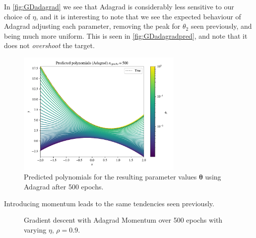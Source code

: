 \documentclass{article}
\theoremstyle{definition}
\begin{document}
In \autoref{fig:GDadagrad} we see that Adagrad is considerably less sensitive to our choice of $\eta$, and it is interesting to note that we see the expected behaviour of Adagrad adjusting each parameter, removing the peak for $\theta_2$ seen previously, and being much more uniform. This is seen in \autoref{fig:GDadagradpred}, and note that it does not \textit{overshoot} the target.

\begin{figure}[H]%
    \centering
    \includegraphics[width=8cm]{Project2/figures/polynomial_grad/OLS_autodiff/adagrad_prediction.pdf}
    \caption{Predicted polynomials for the resulting parameter values $\boldsymbol{\theta}$ using Adagrad after 500 epochs.}
    \label{fig:GDadagradpred}
\end{figure}

Introducing momentum leads to the same tendencies seen previously.

\begin{figure}[H]%
    \centering
    \qquad
    \caption{Gradient descent with Adagrad Momentum over 500 epochs with varying $\eta$, $\rho=0.9$.}%
    \label{fig:GDadagradmomentumeta}%
\end{figure}
\end{document}
